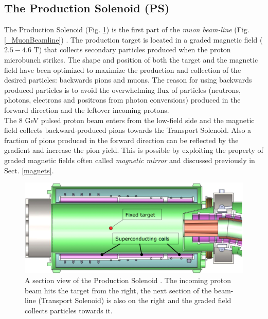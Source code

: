 \documentclass[12pt,a4paper,openright, oneside, titlepage]{book} %
\begin{document}
\subsection{The Production Solenoid (PS)}
The Production Solenoid (Fig. \ref{_PS}) is the first part of the \textit{muon beam-line} (Fig. \ref{_MuonBeamline}) \cite{PS}. 
The production target is located in a graded magnetic field ($2.5 - 4.6$ T) that collects secondary particles produced when the proton microbunch strikes. The shape and position of both the target and the magnetic field have been optimized to maximize the production and collection of the desired particles: backwards pions and muons. 
The reason for using backwards produced particles is to avoid the overwhelming flux of particles 
(neutrons, photons, electrons and positrons from photon conversions) 
produced in the forward direction and the leftover incoming protons.\\
The 8 GeV pulsed proton beam enters from the low-field side and the magnetic field collects backward-produced pions towards the Transport Solenoid. 
Also a fraction of pions produced in the forward direction can be reflected by the gradient and  increase the pion yield. 
This is possible by exploiting the property of graded magnetic fields often called \textit{magnetic mirror} 
and discussed previously in Sect. \ref{magnets}.

\begin{figure}[h!]
\centering
\includegraphics[scale=0.4]{PS}
\caption[Production Solenoid]{A section view of the Production Solenoid \cite{PS}. 
The incoming proton beam hits the target from the right, the next section of the beam-line (Transport Solenoid) is also on the right and the graded field collects particles towards it.}
\label{_PS}
\end{figure}
\end{document}

